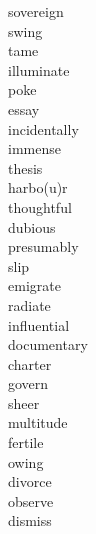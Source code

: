 \documentclass[b5paper, 11pt]{ctexart}
\begin{document}
\begin{multicols*}{3}
\begin{description}
\item[sovereign]

\item[swing]

\item[tame]

\item[illuminate]

\item[poke]

\item[essay]

\item[incidentally]

\item[immense]

\item[thesis]

\item[harbo(u)r]

\item[thoughtful]

\item[dubious]

\item[presumably]

\item[slip]

\item[emigrate]

\item[radiate]

\item[influential]

\item[documentary]

\item[charter]

\item[govern]

\item[sheer]

\item[multitude]

\item[fertile]

\item[owing]

\item[divorce]

\item[observe]

\item[dismiss]


\end{description}
\end{multicols*}
\end{document}
